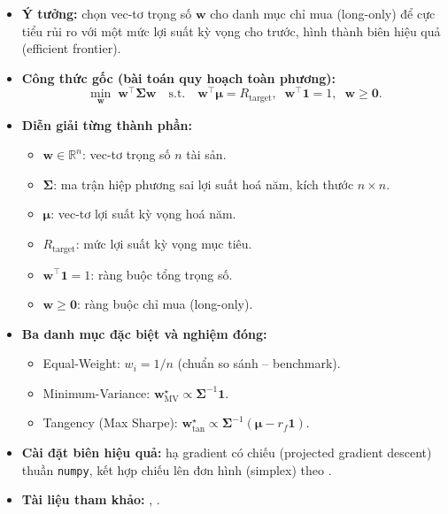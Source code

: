\documentclass[12pt,a4paper,openany,oneside]{report}
\numberwithin{equation}{chapter}
\begin{document}
\begin{itemize}[leftmargin=18pt,topsep=2pt,itemsep=4pt]
  \item \textbf{Ý tưởng:} chọn vec-tơ trọng số $\mathbf{w}$ cho danh mục
        chỉ mua (long-only) để cực tiểu rủi ro với một mức lợi suất kỳ
        vọng cho trước, hình thành biên hiệu quả (efficient frontier).
  \item \textbf{Công thức gốc (bài toán quy hoạch toàn phương):}
        \begin{equation}
          \min_{\mathbf{w}}\;\mathbf{w}^{\!\top}\boldsymbol{\Sigma}\mathbf{w}
          \quad\text{s.t.}\quad
          \mathbf{w}^{\!\top}\boldsymbol{\mu} = R_{\text{target}},\;\;
          \mathbf{w}^{\!\top}\mathbf{1} = 1,\;\;
          \mathbf{w}\ge\mathbf{0}.
          \label{eq:markowitz}
        \end{equation}
  \item \textbf{Diễn giải từng thành phần:}
        \begin{itemize}[leftmargin=14pt,topsep=2pt,itemsep=1pt]
          \item $\mathbf{w} \in \mathbb{R}^n$: vec-tơ trọng số $n$ tài sản.
          \item $\boldsymbol{\Sigma}$: ma trận hiệp phương sai lợi suất
                hoá năm, kích thước $n\times n$.
          \item $\boldsymbol{\mu}$: vec-tơ lợi suất kỳ vọng hoá năm.
          \item $R_{\text{target}}$: mức lợi suất kỳ vọng mục tiêu.
          \item $\mathbf{w}^{\!\top}\mathbf{1} = 1$: ràng buộc tổng trọng số.
          \item $\mathbf{w}\ge\mathbf{0}$: ràng buộc chỉ mua (long-only).
        \end{itemize}
  \item \textbf{Ba danh mục đặc biệt và nghiệm đóng:}
        \begin{itemize}[leftmargin=14pt,topsep=2pt,itemsep=1pt]
          \item Equal-Weight: $w_i = 1/n$ (chuẩn so sánh -- benchmark).
          \item Minimum-Variance:
                $\mathbf{w}^{\star}_{\text{MV}} \propto \boldsymbol{\Sigma}^{-1}\mathbf{1}$.
          \item Tangency (Max Sharpe):
                $\mathbf{w}^{\star}_{\text{tan}} \propto
                 \boldsymbol{\Sigma}^{-1}(\boldsymbol{\mu} - r_f\mathbf{1})$.
        \end{itemize}
  \item \textbf{Cài đặt biên hiệu quả:} hạ gradient có chiếu (projected
        gradient descent) thuần \texttt{numpy}, kết hợp chiếu lên đơn
        hình (simplex) theo \citet{WangCarreira2013}.
  \item \textbf{Tài liệu tham khảo:} \citet{Markowitz1952},
        \citet{WangCarreira2013}.
\end{itemize}
\end{document}
